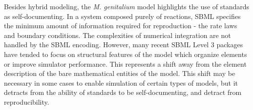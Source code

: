 \documentclass[journal,transmag,twoside]{IEEEtran}
\begin{document}
Besides hybrid modeling, the \textit{M. genitalium} model highlights the use of
standards as self-documenting. In a system composed purely of reactions,
SBML specifies the minimum amount of information required for reproduction - the rate laws and
boundary conditions. The complexities of numerical integration are not handled by the SBML encoding.
However, many recent SBML Level 3 packages have tended to focus on
structural features of the model which organize elements or
improve simulator performance.
This represents a shift away from the element description of the bare mathematical
entities of the model. This shift may be necessary in some cases to enable
simulation of certain types of models, but it detracts from the ability
of standards to be self-documenting, and detract from reproducibility.




\end{document}
